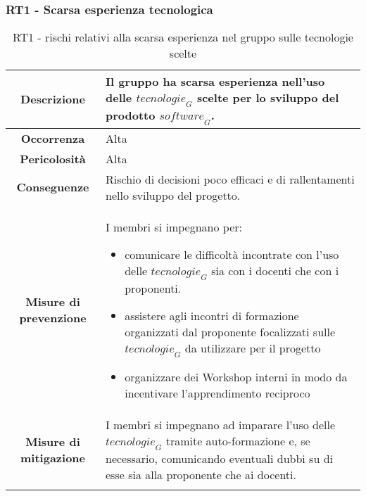 \subsubsection[RT1]{RT1 - Scarsa esperienza tecnologica}\label{rt:1}
\begin{longtable}{|c|p{12cm}|}
\hline
\textbf{Descrizione} & Il gruppo ha scarsa esperienza nell'uso delle $\textit{tecnologie}_G$ scelte per lo sviluppo del prodotto $\textit{software}_G$. \\
\hline
\textbf{Occorrenza} & Alta \\
\hline
\textbf{Pericolosità} & Alta \\
\hline
\textbf{Conseguenze} & Rischio di decisioni poco efficaci e di rallentamenti nello sviluppo del progetto.\\
\hline
\textbf{Misure di prevenzione} & I membri si impegnano per:
\begin{itemize}
    \item comunicare le difficoltà incontrate con l'uso delle $\textit{tecnologie}_G$ sia con i docenti che con i proponenti.
    \item assistere agli incontri di formazione organizzati dal proponente focalizzati sulle $\textit{tecnologie}_G$ da utilizzare per il progetto
    \item organizzare dei Workshop interni in modo da incentivare l'apprendimento reciproco
\end{itemize}
 \\
\hline
\textbf{Misure di mitigazione} & I membri si impegnano ad imparare l'uso delle $\textit{tecnologie}_G$ tramite auto-formazione e, se necessario, comunicando eventuali dubbi su di esse sia alla proponente che ai docenti. \\
\hline
\caption{RT1 - rischi relativi alla scarsa esperienza nel gruppo sulle tecnologie scelte}
\label{tab:scarsa-esperienza}
\end{longtable}

%
%
